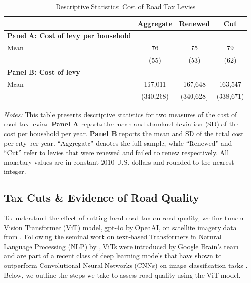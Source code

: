 \begin{table}[ht]
    \centering
    \caption{Descriptive Statistics: Cost of Road Tax Levies}
    \label{tab:levy_stats}
    \begin{threeparttable}
    \begin{tabular}{p{5cm}ccc}
    \hline\hline
    & \textbf{Aggregate} & \textbf{Renewed} & \textbf{Cut} \\
    \hline
    \textbf{Panel A: Cost of levy per household} \\
    Mean & 76 & 75 & 79 \\
       & (55) & (53) & (62) \\
    \hline
    \textbf{Panel B: Cost of levy} \\
    Mean & 167,011 & 167,648 & 163,547 \\
       & (340,268) & (340,628) & (338,671) \\
    \hline\hline
    \end{tabular}
    \begin{tablenotes}[flushleft]
      \footnotesize
      \item \textit{Notes:} 
      This table presents descriptive statistics for two measures of the cost of road tax levies. 
      \textbf{Panel A} reports the mean and standard deviation (SD) of the cost per household per year. 
      \textbf{Panel B} reports the mean and SD of the total cost per city per year. 
      “Aggregate” denotes the full sample, while “Renewed” and “Cut” refer to levies that were renewed and failed to renew respectively.
      All monetary values are in constant 2010 U.S. dollars and rounded to the nearest integer.
    \end{tablenotes}
    \end{threeparttable}
\end{table}





\subsection{Tax Cuts \& Evidence of Road Quality} \label{sec:road_quality}

To understand the effect of cutting local road tax on road quality, we fine-tune a Vision Transformer (ViT) model, gpt-4o by OpenAI, on satellite imagery data from \cite{brewer2021}. Following the seminal work on text-based Transformers in Natural Language Processing (NLP) by \cite{vaswani2017attention}, ViTs were introduced by Google Brain's team and are part of a recent class of deep learning models that have shown to outperform Convolutional Neural Networks (CNNs) on image classification tasks \citep{dosovitskiy2020image}. Below, we outline the steps we take to assess road quality using the ViT model.


